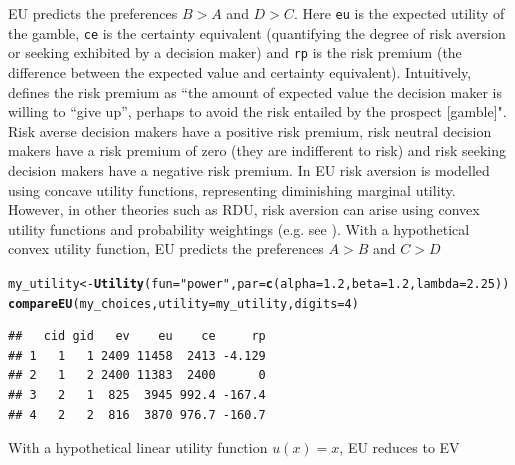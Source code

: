 \documentclass{article}\usepackage[]{graphicx}\usepackage[]{color}
\makeatletter
\newcommand{\hlnum}[1]{\textcolor[rgb]{0.686,0.059,0.569}{#1}}%
\newcommand{\hlstr}[1]{\textcolor[rgb]{0.192,0.494,0.8}{#1}}%
\newcommand{\hlstd}[1]{\textcolor[rgb]{0.345,0.345,0.345}{#1}}%
\newcommand{\hlkwb}[1]{\textcolor[rgb]{0.69,0.353,0.396}{#1}}%
\newcommand{\hlkwc}[1]{\textcolor[rgb]{0.333,0.667,0.333}{#1}}%
\newcommand{\hlkwd}[1]{\textcolor[rgb]{0.737,0.353,0.396}{\textbf{#1}}}%
\newenvironment{kframe}{%
 \def\at@end@of@kframe{}%
 \ifinner\ifhmode%
  \def\at@end@of@kframe{\end{minipage}}%
  \begin{minipage}{\columnwidth}%
 \fi\fi%
 \def\FrameCommand##1{\hskip\@totalleftmargin \hskip-\fboxsep
 \colorbox{shadecolor}{##1}\hskip-\fboxsep
     \hskip-\linewidth \hskip-\@totalleftmargin \hskip\columnwidth}%
 \MakeFramed {\advance\hsize-\width
   \@totalleftmargin\z@ \linewidth\hsize
   \@setminipage}}%
 {\par\unskip\endMakeFramed%
 \at@end@of@kframe}
\newenvironment{knitrout}{}{} %
\makeatother
\begin{document}
EU predicts the preferences $B > A$ and $D > C$.
Here {\tt eu} is the expected utility of the gamble, {\tt ce} is the certainty equivalent (quantifying the degree of risk aversion or seeking exhibited by a decision maker) and
{\tt rp} is the risk premium (the difference between the expected value and certainty equivalent). Intuitively, \citet[][p. 248]{Yates_1990} defines the risk premium as ``the amount of expected value the decision maker is willing to ``give up'', perhaps to avoid the risk entailed by the prospect [gamble]". Risk
averse decision makers have a positive risk premium, risk neutral decision makers have a
risk premium of zero (they are indifferent to risk) and risk seeking decision makers have a negative risk
premium. In EU risk aversion is modelled using concave utility functions, representing diminishing marginal utility. However, in other theories such as RDU, risk aversion can arise using convex utility functions and probability weightings (e.g. see \citet[][p. 52-53, 71-3, 175-176]{Wakker_2010}). With a hypothetical
convex utility function, EU predicts the preferences $A > B$ and $C > D$

\begin{knitrout}
\color{fgcolor}\begin{kframe}
\begin{alltt}
\hlstd{my_utility} \hlkwb{<-} \hlkwd{Utility}\hlstd{(}\hlkwc{fun}\hlstd{=}\hlstr{"power"}\hlstd{,} \hlkwc{par}\hlstd{=}\hlkwd{c}\hlstd{(}\hlkwc{alpha}\hlstd{=}\hlnum{1.2}\hlstd{,} \hlkwc{beta}\hlstd{=}\hlnum{1.2}\hlstd{,} \hlkwc{lambda}\hlstd{=}\hlnum{2.25}\hlstd{))}
\hlkwd{compareEU}\hlstd{(my_choices,} \hlkwc{utility}\hlstd{=my_utility,} \hlkwc{digits}\hlstd{=}\hlnum{4}\hlstd{)}
\end{alltt}
\begin{verbatim}
##   cid gid   ev    eu    ce     rp
## 1   1   1 2409 11458  2413 -4.129
## 2   1   2 2400 11383  2400      0
## 3   2   1  825  3945 992.4 -167.4
## 4   2   2  816  3870 976.7 -160.7
\end{verbatim}
\end{kframe}
\end{knitrout}


With a hypothetical linear utility function $u(x)=x$, EU reduces to EV
\end{document}
